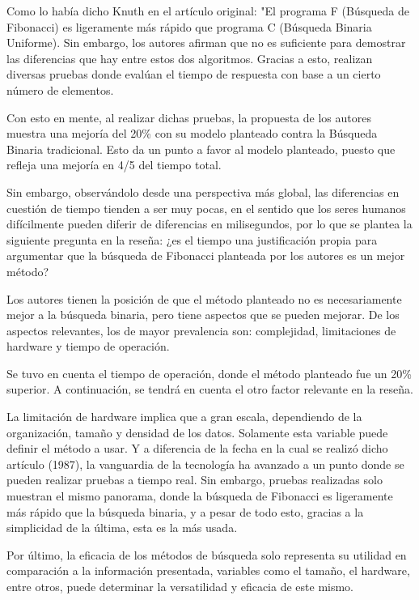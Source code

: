 \documentclass{article}
\begin{document}
Como lo había dicho Knuth \cite{knuth1973art} en el artículo original: "El programa F (Búsqueda de Fibonacci) es ligeramente más rápido que programa C (Búsqueda Binaria Uniforme). Sin embargo, los autores afirman que no es suficiente para demostrar las diferencias que hay entre estos dos algoritmos. Gracias a esto, realizan diversas pruebas donde evalúan el tiempo de respuesta con base a un cierto número de elementos.

Con esto en mente, al realizar dichas pruebas, la propuesta de los autores muestra una mejoría del 20\% con su modelo planteado contra la Búsqueda Binaria tradicional. Esto da un punto a favor al modelo planteado, puesto que refleja una mejoría en 4/5 del tiempo total. 

Sin embargo, observándolo desde una perspectiva más global, las diferencias en cuestión de tiempo tienden a ser muy pocas, en el sentido que los seres humanos difícilmente pueden diferir de diferencias en milisegundos, por lo que se plantea la siguiente pregunta en la reseña: ¿es el tiempo una justificación propia para argumentar que la búsqueda de Fibonacci planteada por los autores es un mejor método?

Los autores tienen la posición de que el método planteado no es necesariamente mejor a la búsqueda binaria, pero tiene aspectos que se pueden mejorar. De los aspectos relevantes, los de mayor prevalencia son: complejidad, limitaciones de hardware y tiempo de operación.

Se tuvo en cuenta el tiempo de operación, donde el método planteado fue un 20\% superior. A continuación, se tendrá en cuenta el otro factor relevante en la reseña.

La limitación de hardware implica que a gran escala, dependiendo de la organización, tamaño y densidad de los datos. Solamente esta variable puede definir el método a usar. Y a diferencia de la fecha en la cual se realizó dicho artículo (1987), la vanguardia de la tecnología ha avanzado a un punto donde se pueden realizar pruebas a tiempo real. Sin embargo, pruebas realizadas solo muestran el mismo panorama, donde la búsqueda de Fibonacci es ligeramente más rápido que la búsqueda binaria, y a pesar de todo esto, gracias a la simplicidad de la última, esta es la más usada.

Por último, la eficacia de los métodos de búsqueda solo representa su utilidad en comparación a la información presentada, variables como el tamaño, el hardware, entre otros, puede determinar la versatilidad y eficacia de este mismo.
\end{document}
